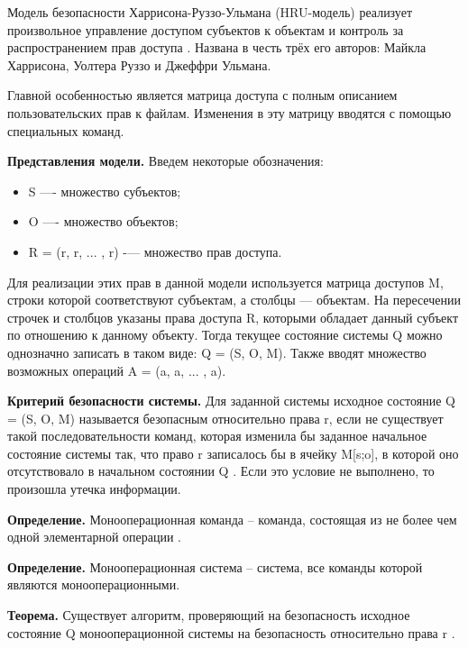 Модель безопасности Харрисона-Руззо-Ульмана (HRU-модель) реализует произвольное управление доступом субъектов к 
объектам и контроль за распространением прав доступа \autocite{Zegzhda}. Названа в честь трёх его авторов: Майкла 
Харрисона, Уолтера Руззо и Джеффри Ульмана.

Главной особенностью является матрица доступа с полным описанием пользовательских прав к файлам. Изменения в эту 
матрицу вводятся с помощью специальных команд.

\textbf{Представления модели.} Введем некоторые обозначения:
\begin{itemize}
    \item S —- множество субъектов;
    \item O —- множество объектов;
    \item R = (r, r, ... , r) -— множество прав доступа.
\end{itemize}
Для реализации этих прав в данной модели используется матрица доступов M, строки которой соответствуют субъектам, 
а столбцы — объектам. На пересечении строчек и столбцов указаны права доступа R, которыми обладает данный субъект 
по отношению к данному объекту. Тогда текущее состояние системы Q можно однозначно записать в таком виде: 
Q = (S, O, M). Также вводят множество возможных операций A = (a, a, ... , a).

\textbf{Критерий безопасности системы.} Для заданной системы исходное состояние Q = (S, 
O, M) называется безопасным относительно права r, если не существует такой 
последовательности команд, которая изменила бы заданное начальное состояние системы так, что право r записалось бы в 
ячейку M[s;o], в которой оно отсутствовало в начальном состоянии Q \autocite{Zegzhda}. Если это условие не выполнено, 
то произошла утечка информации.

\textbf{Определение.} Монооперационная команда -- команда, состоящая из не более чем одной элементарной операции \autocite{Zegzhda}.

\textbf{Определение.} Монооперационная система -- система, все команды которой являются монооперационными.

\textbf{Теорема.} Существует алгоритм, проверяющий на безопасность исходное состояние Q 
монооперационной системы на безопасность относительно права r \autocite{WikiHRU}.

